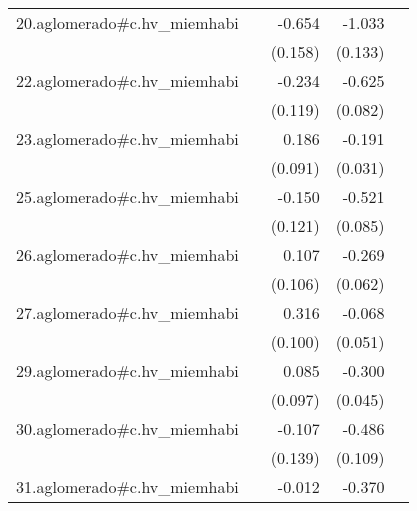 {\begin{longtable}{l*{4}{D{.}{.}{-1}}}
\addlinespace
20.aglomerado#c.hv\_miemhabi&                     &      -0.654\sym{***}&      -1.033\sym{***}&                     \\
            &                     &     (0.158)         &     (0.133)         &                     \\
\addlinespace
22.aglomerado#c.hv\_miemhabi&                     &      -0.234\sym{*}  &      -0.625\sym{***}&                     \\
            &                     &     (0.119)         &     (0.082)         &                     \\
\addlinespace
23.aglomerado#c.hv\_miemhabi&                     &       0.186\sym{*}  &      -0.191\sym{***}&                     \\
            &                     &     (0.091)         &     (0.031)         &                     \\
\addlinespace
25.aglomerado#c.hv\_miemhabi&                     &      -0.150         &      -0.521\sym{***}&                     \\
            &                     &     (0.121)         &     (0.085)         &                     \\
\addlinespace
26.aglomerado#c.hv\_miemhabi&                     &       0.107         &      -0.269\sym{***}&                     \\
            &                     &     (0.106)         &     (0.062)         &                     \\
\addlinespace
27.aglomerado#c.hv\_miemhabi&                     &       0.316\sym{**} &      -0.068         &                     \\
            &                     &     (0.100)         &     (0.051)         &                     \\
\addlinespace
29.aglomerado#c.hv\_miemhabi&                     &       0.085         &      -0.300\sym{***}&                     \\
            &                     &     (0.097)         &     (0.045)         &                     \\
\addlinespace
30.aglomerado#c.hv\_miemhabi&                     &      -0.107         &      -0.486\sym{***}&                     \\
            &                     &     (0.139)         &     (0.109)         &                     \\
\addlinespace
31.aglomerado#c.hv\_miemhabi&                     &      -0.012         &      -0.370\sym{**} &                     \\

\end{longtable}}
